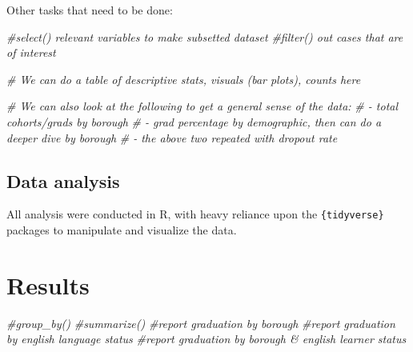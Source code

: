 \documentclass[
  english,
  man, fleqn, noextraspace]{apa6}
\newenvironment{Shaded}{\begin{snugshade}}{\end{snugshade}}
\newcommand{\CommentTok}[1]{\textcolor[rgb]{0.56,0.35,0.01}{\textit{#1}}}
\begin{document}
Other tasks that need to be done:

\begin{Shaded}
\begin{Highlighting}[]
\CommentTok{#select() relevant variables to make subsetted dataset}
\CommentTok{#filter() out cases that are of interest }
\end{Highlighting}
\end{Shaded}

\begin{Shaded}
\begin{Highlighting}[]
\CommentTok{# We can do a table of descriptive stats, visuals (bar plots), counts here}

\CommentTok{# We can also look at the following to get a general sense of the data:}
\CommentTok{# - total cohorts/grads by borough}
\CommentTok{# - grad percentage by demographic, then can do a deeper dive by borough}
\CommentTok{# - the above two repeated with dropout rate}
\end{Highlighting}
\end{Shaded}

\hypertarget{data-analysis}{%
\subsection{Data analysis}\label{data-analysis}}

All analysis were conducted in R, with heavy reliance upon the \texttt{\{tidyverse\}} packages to manipulate and visualize the data.

\hypertarget{results}{%
\section{Results}\label{results}}

\begin{Shaded}
\begin{Highlighting}[]
\CommentTok{#group_by() }
\CommentTok{#summarize() }
\CommentTok{#report graduation by borough}
\CommentTok{#report graduation by english language status}
\CommentTok{#report graduation by borough & english learner status}
\end{Highlighting}
\end{Shaded}
\end{document}
